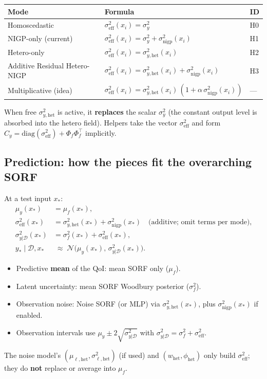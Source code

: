 \documentclass[11pt]{article}
\newcommand{\sigy}{\sigma_{y}^{2}}%
\newcommand{\sighet}{\sigma_{y,\mathrm{het}}^{2}}%
\newcommand{\signigp}{\sigma_{\mathrm{nigp}}^{2}}%
\newcommand{\sigeff}{\sigma_{\mathrm{eff}}^{2}}%
\newcommand{\sigobs}{\sigma_{y|\mathcal{D}}^{2}}%
\newcommand{\Phif}{\Phi_{f}}%
\newcommand{\Cy}{C_{y}}%
\begin{document}
\begin{center}
\small
\begin{tabular}{@{}lll@{}}
\toprule
\textbf{Mode} & \textbf{Formula} & \textbf{ID} \\
\midrule
Homoscedastic & $\sigeff(x_i)=\sigy$ & H0 \\
NIGP-only (current) & $\sigeff(x_i)=\sigy+\signigp(x_i)$ & H1 \\
Hetero-only & $\sigeff(x_i)=\sighet(x_i)$ & H2 \\
Additive Residual Hetero-NIGP &
  $\sigeff(x_i)=\sighet(x_i)+\signigp(x_i)$ & H3 \\
Multiplicative (idea) &
  $\sigeff(x_i)=\sighet(x_i)\,(1+\alpha\,\signigp(x_i))$ & --- \\
\bottomrule
\end{tabular}
\end{center}

\vspace{0.6em}
\noindent
When free $\sighet$ is active, it \textbf{replaces} the scalar $\sigy$
(the constant output level is absorbed into the hetero field).
Helpers take the vector $\sigeff$ and form
$\Cy=\mathrm{diag}(\sigeff)+\Phif\Phif^{\top}$ implicitly.

\subsection{Prediction: how the pieces fit the overarching SORF}
\label{sec:prediction-fit}
At a test input $x_*$:
\begin{equation}
\label{eq:pred-obs}
\begin{aligned}
  \mu_y(x_*)
  &=
  \mu_f(x_*),
  \\
  \sigeff(x_*)
  &=
  \sighet(x_*)+\signigp(x_*)
  \quad\text{(additive; omit terms per mode),}
  \\
  \sigobs(x_*)
  &=
  \sigma_f^{2}(x_*)+\sigeff(x_*),
  \\
  y_*\mid\mathcal{D},x_*
  &\;\approx\;
  \mathcal N\bigl(\mu_y(x_*),\,\sigobs(x_*)\bigr).
\end{aligned}
\end{equation}
\begin{itemize}[leftmargin=1.2em,itemsep=0.2em]
  \item Predictive \textbf{mean} of the QoI: mean SORF only ($\mu_f$).
  \item Latent uncertainty: mean SORF Woodbury posterior ($\sigma_f^{2}$).
  \item Observation noise: Noise SORF (or MLP) via $\sighet(x_*)$, plus $\signigp(x_*)$ if enabled.
  \item Observation intervals use
        $\mu_y\pm 2\sqrt{\sigobs}$ with $\sigobs=\sigma_f^{2}+\sigeff$.
\end{itemize}
The noise model's $(\mu_{\ell,\mathrm{het}},\sigma_{\ell,\mathrm{het}}^{2})$ (if used)
and $(w_{\mathrm{het}},\phi_{\mathrm{het}})$ only build $\sigeff$;
they do \textbf{not} replace or average into $\mu_f$.
\end{document}
